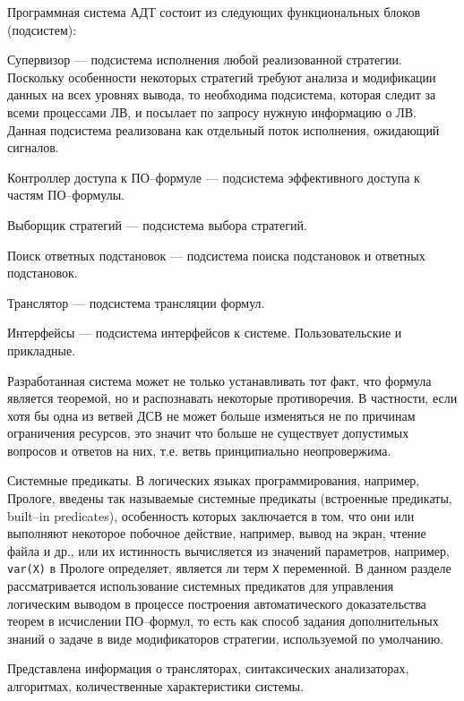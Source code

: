 \documentclass[a4paper]{report}
\begin{document}
Программная система АДТ состоит из следующих функциональных блоков (подсистем):
\begin{description}
  \item{Супервизор} --- подсистема исполнения любой реализованной стратегии. Поскольку особенности некоторых стратегий требуют анализа и модификации данных на всех уровнях вывода, то необходима подсистема, которая следит за всеми процессами ЛВ, и посылает по запросу нужную информацию о ЛВ. Данная подсистема реализована как отдельный поток исполнения, ожидающий сигналов.
  \item{Контроллер доступа к ПО--формуле} --- подсистема эффективного доступа к частям ПО--формулы.
  \item{Выборщик стратегий} --- подсистема выбора стратегий.
  \item{Поиск ответных подстановок} --- подсистема поиска подстановок и ответных подстановок.
  \item{Транслятор} --- подсистема трансляции формул.
  \item{Интерфейсы} --- подсистема интерфейсов к системе. Пользовательские и прикладные.
\end{description}

Разработанная система может не только устанавливать тот факт, что формула является теоремой, но и распознавать некоторые противоречия. В частности, если хотя бы одна из ветвей ДСВ не может больше изменяться не по причинам ограничения ресурсов, это значит что больше не существует допустимых вопросов и ответов на них, т.е. ветвь принципиально неопровержима.

Системные предикаты. В логических языках программирования, например, Прологе, введены так называемые системные предикаты (встроенные предикаты, built--in predicates), особенность которых заключается в том, что они или выполняют некоторое побочное действие, например, вывод на экран, чтение файла и др., или их истинность вычисляется из значений параметров, например, \texttt{var(X)} в Прологе определяет, является ли терм \texttt{X} переменной. В данном разделе рассматривается использование системных предикатов для управления логическим выводом в процессе построения автоматического доказательства теорем в исчислении ПО--формул, то есть как способ задания дополнительных знаний о задаче в виде модификаторов стратегии, используемой по умолчанию.

Представлена информация о трансляторах, синтаксических анализаторах, алгоритмах, количественные характеристики системы.
\end{document}
